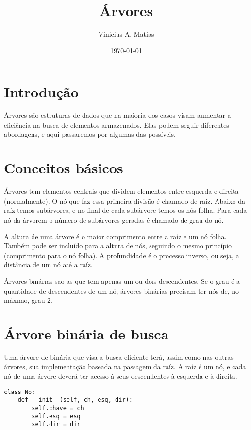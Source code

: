 \documentclass[a4paper, twocolumn]{article}
\title{Árvores}
\author{Vinicius A. Matias}
\date{\today}
\theoremstyle{definition}
\begin{document}
	\maketitle
	
	\section{Introdução}
	Árvores são estruturas de dados que na maioria dos casos visam aumentar a eficiência na busca de elementos armazenados. Elas podem seguir diferentes abordagens, e aqui passaremos por algumas das possíveis. 
	
	\section{Conceitos básicos}
	Árvores tem elementos centrais que dividem elementos entre esquerda e direita (normalmente). O nó que faz essa primeira divisão é chamado de raíz. Abaixo da raíz temos subárvores, e no final de cada subárvore temos os nós folha. Para cada nó da árvorem o número de subárvores geradas é chamado de grau do nó.
	
	A altura de uma árvore é o maior comprimento entre a raíz e um nó folha. Também pode ser incluído para a altura de nós, seguindo o mesmo princípio (comprimento para o nó folha).  A profundidade é o processo inverso, ou seja, a distância de um nó até a raíz. 
	
	Árvores binárias são as que tem apenas um ou dois descendentes. Se o grau é a quantidade de descendentes de um nó, árvores binárias precisam ter nós de, no máximo, grau 2.

\section{Árvore binária de busca}
Uma árvore de binária que visa a busca eficiente terá, assim como nas outras árvores, sua implementação baseada na passagem da raíz. A raíz é um nó, e cada nó de uma árvore deverá ter acesso à seus descendentes à esquerda e à direita.

\begin{lstlisting}[label=abp_no,caption= Nó de uma árvore binária de pesquisa]
class No:
    def __init__(self, ch, esq, dir):
        self.chave = ch
        self.esq = esq
        self.dir = dir
\end{lstlisting}




	
\end{document}
